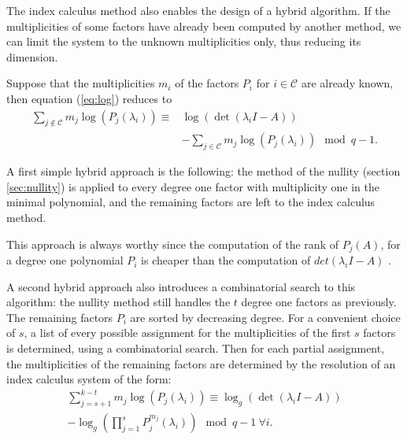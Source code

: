 \documentclass{article}
\begin{document}
The index calculus method also enables the design of a hybrid
algorithm. If the multiplicities of some factors have already been computed by
another method, we can limit the system to the unknown multiplicities only, thus
reducing its dimension.  

Suppose that the multiplicities $m_i$ of the factors
$P_i$ for $i \in \mathcal{C}$ are already known, then equation (\ref{eq:log}) reduces to 
{\small
\begin{equation}\label{eq:log2}
  \begin{split}
    \sum_{j \notin \mathcal{C}}  m_j\log(P_j(\lambda_i)) \equiv&
    \log(\det(\lambda_i I - A))\\
    &-\sum_{j\in \mathcal{C}} m_j\log(P_j(\lambda_i))\mod q-1.
  \end{split}
\end{equation}
}

A first simple hybrid approach is the following: the method of
the nullity  (section \ref{sec:nullity}) is applied to every degree one factor
with multiplicity one in the minimal polynomial, and the remaining factors 
are left to the index calculus method.

This approach is always worthy since the computation of the rank of $P_j(A)$,
for a degree one polynomial $P_i$ is cheaper than the computation of
$det(\lambda_iI-A)$ \cite{jgd:2002:villard}.




A second hybrid approach also introduces a combinatorial search to this
algorithm: the nullity method still handles the $t$ degree one factors as
previously. 
The remaining factors $P_i$ are sorted by decreasing degree. For a
convenient choice of $s$, a list of every possible assignment for the
multiplicities of the first $s$ factors is determined, using a combinatorial search.
Then for each partial assignment, the multiplicities of the remaining factors
are determined by the resolution of an index calculus system of the form:
{\small \begin{equation}
\begin{split}
 \sum_{j=s+1}^{k-t}  m_j\log(P_j(\lambda_i)) \equiv
\log_g(\det(\lambda_i I - A)) \\
- \log_g \left(\prod_{j=1}^s P_j^{m_j}(\lambda_i)\right) \mod q-1 ~\forall i .
\end{split}
\end{equation}
}
\end{document}
